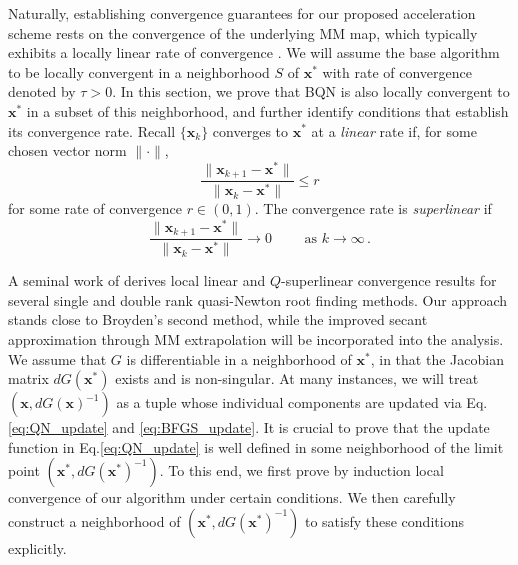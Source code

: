 \documentclass{statsoc}
\newcommand{\bx}{\boldsymbol{x}}
\begin{document}
Naturally, establishing convergence guarantees for our proposed acceleration scheme  rests on the convergence of the underlying MM map, which typically exhibits a locally linear rate of convergence \citep{lange2016mm}. We will assume the base algorithm to be locally convergent in a neighborhood $S$ of $\bx^\ast$ with  rate of convergence denoted by $\tau > 0$. In this section, we prove that BQN is also locally convergent to $\bx^\ast$ in a subset of this neighborhood, and further identify conditions that establish its convergence rate. 
Recall  $\{\bx_k\}$ converges to $\bx^\ast$ at a \textit{linear} rate if, for some chosen vector norm $\|\cdot\|$,
\[
\dfrac{\|\bx_{k+1} - \bx^\ast\|}{\|\bx_k - \bx^\ast\|} \leq r
\]
for some rate of convergence $r \in (0,1)$. The convergence rate is \textit{superlinear} if 
\[
\dfrac{\|\bx_{k+1} - \bx^\ast\|}{\|\bx_k - \bx^\ast\|} \to 0 \qquad\text{ as } k \to \infty\,.
\]


A seminal work of \cite{broyden1973local} derives  local linear and $Q$-superlinear convergence results for several single and double rank quasi-Newton root finding methods. %
Our approach stands close to Broyden's second method, %
while the improved secant approximation through  MM extrapolation will be incorporated into the analysis. We assume that $G$ is differentiable in a neighborhood of $\bx^\ast$, in that the Jacobian matrix $dG(\bx^\ast)$ exists and is non-singular. At many instances, we will treat $(\bx, dG(\bx)^{-1})$ as a tuple whose individual components are updated via Eq.\eqref{eq:QN_update} and \eqref{eq:BFGS_update}. It is crucial to prove that the update function in Eq.\eqref{eq:QN_update} is well defined in some neighborhood of the limit point $(\bx^\ast, dG(\bx^\ast)^{-1})$. To this end, we first prove by induction local convergence of our algorithm under certain conditions. We then carefully construct a neighborhood of $(\bx^\ast, dG(\bx^\ast)^{-1})$ to satisfy these conditions explicitly. 
\end{document}
